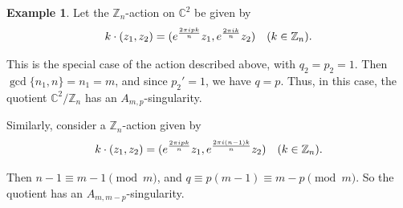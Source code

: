 \documentclass[10pt,a4paper,reqno]{amsart}
\newtheorem{thm}{Theorem}[section]
\theoremstyle{definition}
\newtheorem{exam}[thm]{Example}
\numberwithin{equation}{section}
\numberwithin{figure}{section}
\newcommand{\Z}{\mathbb{Z}}
\newcommand{\C}{\mathbb{C}}
\newcommand{\ep}{\epsilon}
\newcommand{\arrowr}{\rightarrow}
\begin{document}
\begin{exam} \label{ex:Anq}
Let the $\Z_n$-action on $\C^2$ be given by 
\begin{equation}
k\cdot (z_1,z_2)=(e^{\frac{2\pi i p k}{n}}z_1, e^{\frac{2\pi i k}{n}}z_2) \hskip 1em (k\in\Z_n).
\end{equation}

This is the special case of the action described above, with $q_2=p_2=1$.
Then $\gcd\{n_1, n\}=n_1=m$, and since $p_2'=1$, we have $q=p$.
Thus, in this case, the quotient $\C^2/\Z_n$ has an $A_{m,p}$-singularity. 


Similarly, consider a $\Z_n$-action given by 
\begin{equation}
k\cdot (z_1,z_2)=(e^{\frac{2\pi i p k }{n}}z_1, e^{\frac{2\pi i (n-1) k}{n}}z_2) \hskip 1em (k\in\Z_n).
\end{equation}

Then $n-1\equiv m-1 \pmod m$, and $q \equiv p(m-1)\equiv m-p \pmod m$. 
So the quotient has an $A_{m,m-p}$-singularity.
\end{exam}


%
%
%
\end{document}
